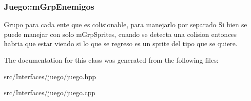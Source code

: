 \subsubsection[{\texorpdfstring{m\+Grp\+Enemigos}{mGrpEnemigos}}]{ Juego\+::m\+Grp\+Enemigos\hspace{0.3cm}{\ttfamily [protected]}}\hypertarget{class_juego_a21212e537ac309102310b5d6eec8b05d}{}\label{class_juego_a21212e537ac309102310b5d6eec8b05d}
Grupo para cada ente que es colisionable, para manejarlo por separado Si bien se puede manejar con solo m\+Grp\+Sprites, cuando se detecta una colision entonces habria que estar viendo si lo que se regreso es un sprite del tipo que se quiere. 

The documentation for this class was generated from the following files\+:\begin{DoxyCompactItemize}
\item 
src/\+Interfaces/juego/juego.\+hpp\item 
src/\+Interfaces/juego/juego.\+cpp\end{DoxyCompactItemize}
